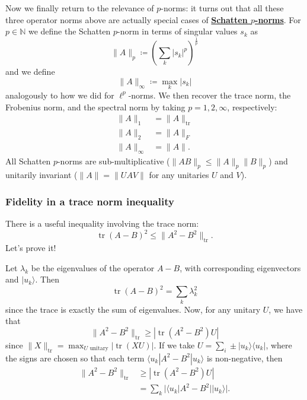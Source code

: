 \documentclass[fleqn,a4paper]{article}
\theoremstyle{definition}
\theoremstyle{definition}
\theoremstyle{definition}
\theoremstyle{definition}
\theoremstyle{remark}
\begin{document}
Now we finally return to the relevance of \(p\)-norms: it turns out that all these three operator norms above are actually special cases of \href{https://en.wikipedia.org/wiki/Schatten_norm}{\textbf{Schatten \(p\)-norms}}.
For \(p\in\mathbb{N}\) we define the Schatten \(p\)-norm in terms of singular values \(s_k\) as
\[
  \|A\|_p \coloneqq \left( \sum_k |s_k|^p \right)^\frac{1}{p}
\]
and we define
\[
  \|A\|_\infty \coloneqq \max_k |s_k|
\]
analogously to how we did for \(\ell^p\)-norms.
We then recover the trace norm, the Frobenius norm, and the spectral norm by taking \(p=1,2,\infty\), respectively:
\[
  \begin{aligned}
    \|A\|_1
    &= \|A\|_{\operatorname{tr}}
  \\\|A\|_2
    &= \|A\|_F
  \\\|A\|_\infty
    &= \|A\|.
  \end{aligned}
\]
All Schatten \(p\)-norms are sub-multiplicative (\(\|AB\|_p\leqslant\|A\|_p\|B\|_p\)) and unitarily invariant (\(\|A\|=\|UAV\|\) for any unitaries \(U\) and \(V\)).

\hypertarget{fidelity-in-a-trace-norm-inequality}{%
\subsubsection{Fidelity in a trace norm inequality}\label{fidelity-in-a-trace-norm-inequality}}

There is a useful inequality involving the trace norm:
\[
  \operatorname{tr}(A-B)^2 \leqslant\|A^2-B^2\|_{\operatorname{tr}}.
\]
Let's prove it!

Let \(\lambda_k\) be the eigenvalues of the operator \(A-B\), with corresponding eigenvectors and \(|u_k\rangle\).
Then
\[
  \operatorname{tr}(A-B)^2 = \sum_k \lambda_k^2
\]
since the trace is exactly the sum of eigenvalues.
Now, for any unitary \(U\), we have that
\[
  \|A^2-B^2\|_{\operatorname{tr}} \geqslant|\operatorname{tr}(A^2-B^2)U|
\]
since \(\|X\|_{\operatorname{tr}}=\max_{U\text{ unitary}} |\operatorname{tr}(XU)|\).
If we take \(U=\sum_i\pm|u_k\rangle\langle u_k|\), where the signs are chosen so that each term \(\langle u_k|A^2-B^2|u_k\rangle\) is non-negative, then
\[
  \begin{aligned}
    \|A^2-B^2\|_{\operatorname{tr}}
    &\geqslant|\operatorname{tr}(A^2-B^2)U|
  \\&= \sum_k |\langle u_k|A^2-B^2||u_k\rangle|.
  \end{aligned}
\]
\end{document}
